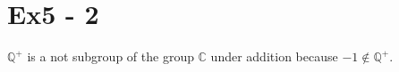 \section*{Ex5 - 2}

$ \mathbb{Q}^+ $ is a not subgroup of the group $ \mathbb{C} $ under addition because $ -1 \notin \mathbb{Q}^+ $.